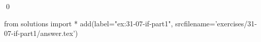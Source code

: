 
\begin{ex}
  \label{ex:31-07-if-part1}
  
  \qed
\end{ex}
\begin{python0}
from solutions import *
add(label="ex:31-07-if-part1",
    srcfilename='exercises/31-07-if-part1/answer.tex')
\end{python0}
